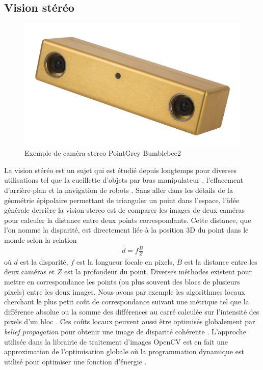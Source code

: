 \subsection{Vision stéréo}\label{subsec:stereo_vision}

\begin{figure}[h]
  \centering
  \includegraphics[width=0.5\linewidth]{images/bumblebee2.jpg}
  \caption[Exemple de caméra stereo]{Exemple de caméra stereo PointGrey Bumblebee2}
  \label{fig:stereo_camera}
\end{figure}

La vision stéréo est un sujet qui est étudié depuis longtemps pour diverses utilisations tel que la cueillette d'objets par bras manipulateur \citep{Hernandez2017}, l'effacement d'arrière-plan \citep{Kanade1996Stereo} et la navigation de robots \citep{Fraundorfer2012}. Sans aller dans les détails de la géométrie épipolaire permettant de trianguler un point dans l'espace, l'idée générale derrière la vision stereo est de comparer les images de deux caméras pour calculer la distance entre deux points correspondants. Cette distance, que l'on nomme la disparité, est directement liée à la position 3D du point dans le monde selon la relation
\begin{align}
  d = f \frac{B}{Z}
\end{align}
où $d$ est la disparité, $f$ est la longueur focale en pixels, $B$ est la distance entre les deux caméras et $Z$ est la profondeur du point. Diverses méthodes existent pour mettre en correspondance les points (ou plus souvent des blocs de plusieurs pixels) entre les deux images. Nous avons par exemple les algorithmes locaux cherchant le plus petit coût de correspondance suivant une métrique tel que la différence absolue ou la somme des différences au carré calculée sur l'intensité des pixels d'un bloc \citep{Szeliski2011}. Ces coûts locaux peuvent aussi être optimisés globalement par \textit{belief propagation} pour obtenir une image de disparité cohérente \citep{Klaus2006}. L'approche utilisée dans la librairie de traitement d'images OpenCV est en fait une approximation de l'optimisation globale où la programmation dynamique est utilisé pour optimiser une fonction d'énergie \citep{Hirschmuller2008}.

